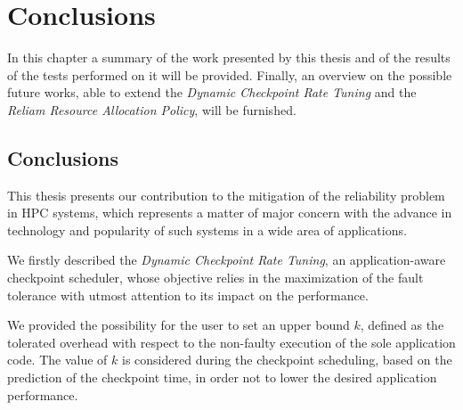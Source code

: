 \cleardoublepage
%
%
%
\chapter{Conclusions}
%
%
\label{cap:conclusions}

In this chapter a summary of the work presented by this thesis and of the results of the tests performed on it will be provided. Finally, an overview on the possible future works, able to extend the \emph{Dynamic Checkpoint Rate Tuning} and the \emph{Reliam Resource Allocation Policy}, will be furnished.

\section{Conclusions}
This thesis presents our contribution to the mitigation of the reliability problem in HPC systems, which represents a matter of major concern with the advance in technology and popularity of such systems in a wide area of applications.

We firstly described the \emph{Dynamic Checkpoint Rate Tuning}, an application-aware checkpoint scheduler, whose objective relies in the maximization of the fault tolerance with utmost attention to its impact on the performance.

We provided the possibility for the user to set an upper bound $k$, defined as the tolerated overhead with respect to the non-faulty execution of the sole application code. The value of $k$ is considered during the checkpoint scheduling, based on the prediction of the checkpoint time, in order not to lower the desired application performance.
 
